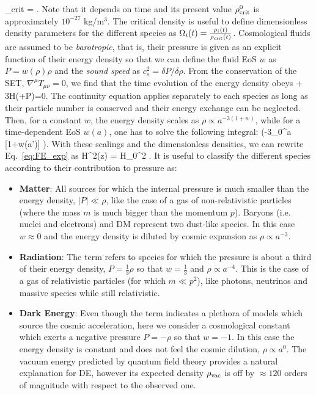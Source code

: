 %
\be
\label{eq:critdens}
\rho_{\rm{crit}} = .
\ee
%
Note that it depends on time and its present value $\rho_{\rm{crit}}^{0}$ is approximately $10^{-27}$ kg/m$^3$.
The critical density is useful to define dimensionless density parameters for the different species as 
$\Omega_i(t) = \frac{\rho_i(t)}{\rho_{\rm{crit}}(t)}$. Cosmological fluids are assumed to be 
\emph{barotropic}, that is, their pressure is given as an explicit function of their energy density so that we 
can define the fluid \gls{EoS} $w$ as $P = w(\rho)\rho$ and the \emph{sound
speed} as $c_s^2 = \delta P/\delta\rho$.  From the conservation of the \gls{SET}, $\nabla^{\mu}T_{\mu\nu}=0$,
we find that the time evolution of the energy density obeys
%
\be
\label{eq:cont}
\dot{\rho} + 3H(\rho+P)=0.
\ee
%
The continuity equation applies separately to each species as long as their particle number is conserved
and their energy exchange can be neglected. Then, for a constant $w$, the energy density scales as
$\rho \propto a^{-3(1+w)}$, while for a time-dependent EoS $w(a)$, one has to solve the following
integral:
%
\be
\label{eq:densev}
\rho \propto \exp \biggl(-3\int_0^a [1+w(a')] \biggr).
\ee
%
With these scalings and the dimensionless densities, we can rewrite Eq.~\eqref{eq:FE_exp} as
%
\be
\label{eq:h_z}
H^2(z) = H_0^2 .
\ee
%
It is useful to classify the different species according to their contribution to pressure as:
\begin{itemize}
\item{\textbf{Matter}: All sources for which the internal pressure is much smaller than the energy density,
$|P| \ll \rho$, like the case of a gas of non-relativistic particles (where the mass $m$ is much bigger than
the momentum $p$). Baryons (i.e. nuclei and electrons) and \gls{DM} represent two dust-like species.
In this case $w\approx 0$ and the energy density is diluted by cosmic expansion as $\rho \propto a^{-3}$.}
\item{\textbf{Radiation}: The term refers to species for which the pressure is about a third of their energy
density, $P=\frac{1}{3}\rho$ so that $w=\frac{1}{3}$ and $\rho \propto a^{-4}$. 
This is the case of a gas of relativistic particles (for which $m\ll p^2$), like photons, neutrinos and massive
species while still relativistic.}
\item{\textbf{Dark Energy}: Even though the term indicates a plethora of models which source the cosmic
acceleration, here we consider a cosmological constant which exerts a negative 
pressure $P=-\rho$ so that $w = -1$. In this case the energy density is constant and does not feel the 
cosmic dilution, $\rho \propto a^0$. The vacuum energy predicted by quantum field theory provides a 
natural explanation for \gls{DE}, however its expected density $\rho_{\rm{vac}}$ is off by $\approx 120$ orders 
of magnitude with respect to the observed one.}
\end{itemize}


